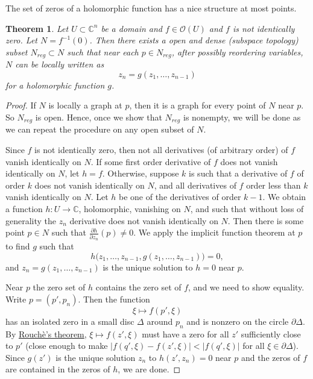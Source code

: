 \documentclass[12pt,openany]{book}
\newcommand{\sabs}[1]{\lvert {#1} \rvert}
\newcommand{\C}{{\mathbb{C}}}
\newcommand{\sO}{{\mathscr{O}}}
\theoremstyle{plain}
\newtheorem{thm}{Theorem}[section]
\theoremstyle{remark}
\theoremstyle{definition}
\theoremstyle{exercise}
\theoremstyle{example}
\begin{document}
\pagebreak[2]
The set of zeros of a holomorphic function has a nice structure at most
points.

\begin{thm} \label{thm:regptsdense}
Let $U \subset \C^n$ be a domain and
$f \in \sO(U)$ and $f$ is not identically zero.
Let $N = f^{-1}(0)$.  Then there exists a open and dense (subspace topology) subset
$N_{\mathit{reg}} \subset N$
such that near each $p \in N_{\mathit{reg}}$, after possibly reordering variables,
$N$ can be locally written as
\begin{equation*}
z_n = g(z_1,\ldots,z_{n-1})
\end{equation*}
for a holomorphic function $g$.
\end{thm}

\begin{proof}
If $N$ is locally a graph at $p$, then it is a graph
for every point of $N$ near $p$.  So $N_{\mathit{reg}}$
is open.  Hence, once we show that $N_{\mathit{reg}}$ is nonempty, 
we will be done as we can
repeat the procedure on any open subset of $N$.

Since $f$ is not identically zero, then not all derivatives (of arbitrary
order) of $f$
vanish identically on $N$.
If some first order derivative of $f$ does not vanish identically on $N$,
let $h=f$.
Otherwise, suppose $k$ is such that a derivative of $f$ of order $k$
does not vanish identically on $N$, and
all derivatives of $f$ order less than $k$ vanish identically on
$N$.  Let $h$ be one of the derivatives of order $k-1$.
We obtain a function $h \colon U \to \C$, holomorphic, vanishing on $N$,
and such that 
without loss of generality the $z_n$ derivative does not vanish identically
on $N$.  Then there is some point $p \in N$ such that $\frac{\partial
h}{\partial z_n}(p) \not= 0$.
We apply the implicit function theorem at $p$ to find $g$ such that
\begin{equation*}
h\bigr(z_1,\ldots,z_{n-1},g(z_1,\ldots,z_{n-1})\bigr) = 0 ,
\end{equation*}
and $z_n = g(z_1,\ldots,z_{n-1})$ is the unique solution to
$h=0$ near $p$.

Near $p$ the zero set of $h$ contains the zero set of $f$, and
we need to show equality.
Write $p = (p',p_n)$.  Then the function
\begin{equation*}
\xi \mapsto f(p',\xi)
\end{equation*}
has an isolated zero in a small disc $\Delta$ around $p_n$ and is
nonzero on the circle $\partial \Delta$.  By
\hyperref[thm:onevarrouche]{Rouch\`e's theorem},
$\xi \mapsto f(z',\xi)$ must have a zero for all $z'$ sufficiently close to $p'$
(close enough to make $\sabs{f(q',\xi)-f(z',\xi)} < \sabs{f(q',\xi)}$ for all $\xi \in
\partial \Delta$).
Since $g(z')$ is the unique solution $z_n$ to $h(z',z_n) = 0$
near $p$ and the
zeros of $f$ are contained in the zeros of $h$, we are done.
\end{proof}
\end{document}
